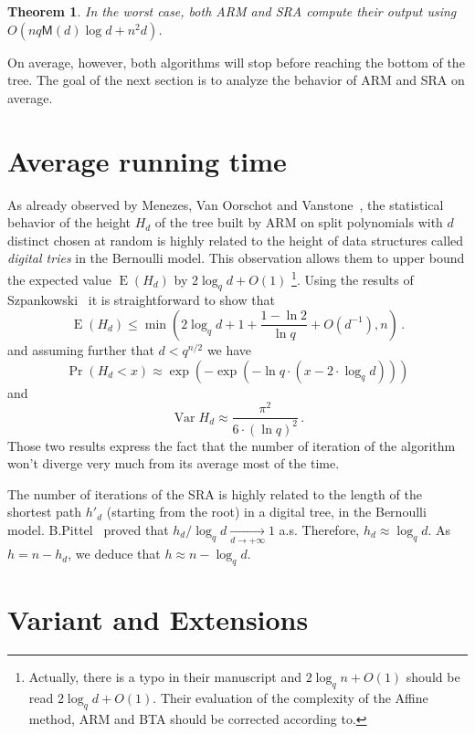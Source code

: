 \documentclass{sig-alternate}
\newcommand{\dd}{d}
\newcommand{\qq}{q}
\newcommand{\nn}{n}
\DeclareMathOperator{\Var}{Var}
\DeclareMathOperator{\Exp}{E}
\newcommand{\bigO}{O}
\newcommand{\Mul}{\mathsf{M}}
\newcounter{algo}
\newtheorem{Theo}{Theorem}
\begin{document}
 \begin{Theo}
   In the worst case, both ARM and SRA compute their output using
   $O(nq\Mul(d)\log d + n^2d)$.
 \end{Theo}
 
 On average, however, both algorithms will stop before reaching the
 bottom of the tree. The goal of the next section is to analyze the
 behavior of ARM and SRA on average.

\section{Average running time}

 As already observed by Menezes, Van Oorschot and Vanstone~\cite{Menvanovans92}, 
the statistical behavior of the height $H_{\dd}$ of the tree built by ARM on split polynomials with $\dd$ distinct chosen at random is highly 
related to the height of data structures called \emph{digital tries} in the Bernoulli model. This observation allows them to upper bound the expected value $\Exp(H_{\dd})$ by $2\log_q \dd + \bigO(1)$
\footnote{Actually, there is a typo in their manuscript and $ 2\log_q \nn + \bigO(1)$ should be read $2\log_q \dd + \bigO(1)$. Their evaluation of the complexity of the Affine method, ARM and BTA should be corrected according to.}.
 Using the results of Szpankowski~\cite{szpankowski1986analysis} it is straightforward to show that 
   $$\Exp(H _\dd) \le  \min(2 \log_\qq \dd +1 +\frac{1-\ln 2}{\ln \qq} + \bigO(\dd^{-1}), \nn)\,.$$
and assuming further that $\dd < \qq^{n/2}$ we have
 $$\Pr(H_\dd <x) \approx \exp(-\exp(-\ln \qq \cdot (x-2 \cdot \log_\qq \dd)))$$ 
 and 
 $$\Var H_\dd \approx \frac{\pi^2}{6 \cdot (\ln \qq)^2} \,.$$
Those two results express the fact that the number of iteration of the algorithm won't diverge very much from its average most of the time.

\medskip

 The number of iterations of the SRA is highly related to the length of the shortest path $h'_d$ (starting from the root)
   in a digital tree, in the Bernoulli model. B.Pittel~\cite{Pittel86} proved that $h_d/\log_{q} d \underset{d \to +\infty}{\longrightarrow} 1$ a.s. Therefore, $h_d \approx \log_{q} d$.
  As $h=n-h_d$, we deduce that $h \approx n-\log_{q} d$.




\section{Variant and Extensions}
\end{document}
